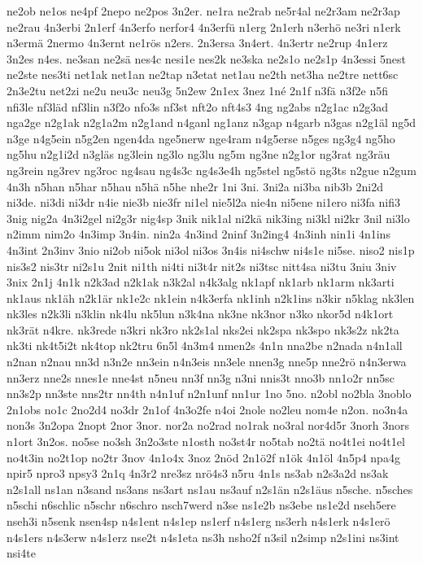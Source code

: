 {ne2ob
ne1os
ne4pf
2nepo
ne2pos
3n2er.
ne1ra
ne2rab
ne5r4al
ne2r3am
ne2r3ap
ne2rau
4n3erbi
2n1erf
4n3erfo
nerfor4
4n3erfü
n1erg
2n1erh
n3erhö
ne3ri
n1erk
n3ermä
2nermo
4n3ernt
ne1rös
n2ers.
2n3ersa
3n4ert.
4n3ertr
ne2rup
4n1erz
3n2es
n4es.
ne3san
ne2sä
nes4c
nesi1e
nes2k
ne3ska
ne2s1o
ne2s1p
4n3essi
5nest
ne2ste
nes3ti
net1ak
net1an
ne2tap
n3etat
net1au
ne2th
net3ha
ne2tre
nett6sc
2n3e2tu
net2zi
ne2u
neu3c
neu3g
5n2ew
2n1ex
3nez
1né
2n1f
n3fä
n3f2e
n5fi
nfi3le
nf3läd
nf3lin
n3f2o
nfo3s
nf3st
nft2o
nft4s3
4ng
ng2abs
n2g1ac
n2g3ad
nga2ge
n2g1ak
n2g1a2m
n2g1and
n4ganl
ng1anz
n3gap
n4garb
n3gas
n2g1äl
ng5d
n3ge
n4g5ein
n5g2en
ngen4da
nge5nerw
nge4ram
n4g5erse
n5ges
ng3g4
ng5ho
ng5hu
n2g1i2d
n3gläs
ng3lein
ng3lo
ng3lu
ng5m
ng3ne
n2g1or
ng3rat
ng3räu
ng3rein
ng3rev
ng3roc
ng4sau
ng4s3c
ng4s3e4h
ng5stel
ng5stö
ng3ts
n2gue
n2gum
4n3h
n5han
n5har
n5hau
n5hä
n5he
nhe2r
1ni
3ni.
3ni2a
ni3ba
nib3b
2ni2d
ni3de.
ni3di
ni3dr
n4ie
nie3b
nie3fr
ni1el
nie5l2a
nie4n
ni5ene
ni1ero
ni3fa
nifi3
3nig
nig2a
4n3i2gel
ni2g3r
nig4sp
3nik
nik1al
ni2kä
nik3ing
ni3kl
ni2kr
3nil
ni3lo
n2imm
nim2o
4n3imp
3n4in.
nin2a
4n3ind
2ninf
3n2ing4
4n3inh
nin1i
4n1ins
4n3int
2n3inv
3nio
ni2ob
ni5ok
ni3ol
ni3os
3n4is
ni4schw
ni4s1e
ni5se.
niso2
nis1p
nis3s2
nis3tr
ni2s1u
2nit
ni1th
ni4ti
ni3t4r
nit2s
ni3tsc
nitt4sa
ni3tu
3niu
3niv
3nix
2n1j
4n1k
n2k3ad
n2k1ak
n3k2al
n4k3alg
nk1apf
nk1arb
nk1arm
nk3arti
nk1aus
nk1äh
n2k1är
nk1e2c
nk1ein
n4k3erfa
nk1inh
n2k1ins
n3kir
n5klag
nk3len
nk3les
n2k3li
n3klin
nk4lu
nk5lun
n3k4na
nk3ne
nk3nor
n3ko
nkor5d
n4k1ort
nk3rät
n4kre.
nk3rede
n3kri
nk3ro
nk2s1al
nks2ei
nk2spa
nk3spo
nk3s2z
nk2ta
nk3ti
nk4t5i2t
nk4top
nk2tru
6n5l
4n3m4
nmen2s
4n1n
nna2be
n2nada
n4n1all
n2nan
n2nau
nn3d
n3n2e
nn3ein
n4n3eis
nn3ele
nnen3g
nne5p
nne2rö
n4n3erwa
nn3erz
nne2s
nnes1e
nne4st
n5neu
nn3f
nn3g
n3ni
nnis3t
nno3b
nn1o2r
nn5sc
nn3s2p
nn3ste
nns2tr
nn4th
n4n1uf
n2n1unf
nn1ur
1no
5no.
n2obl
no2bla
3noblo
2n1obs
no1c
2no2d4
no3dr
2n1of
4n3o2fe
n4oi
2nole
no2leu
nom4e
n2on.
no3n4a
non3s
3n2opa
2nopt
2nor
3nor.
nor2a
no2rad
no1rak
no3ral
nor4d5r
3norh
3nors
n1ort
3n2os.
no5se
no3sh
3n2o3ste
n1osth
no3st4r
no5tab
no2tä
no4t1ei
no4t1el
no4t3in
no2t1op
no2tr
3nov
4n1o4x
3noz
2nöd
2n1ö2f
n1ök
4n1öl
4n5p4
npa4g
npir5
npro3
npsy3
2n1q
4n3r2
nre3sz
nrö4s3
n5ru
4n1s
ns3ab
n2s3a2d
ns3ak
n2s1all
ns1an
n3sand
ns3ans
ns3art
ns1au
ns3auf
n2s1än
n2s1äus
n5sche.
n5sches
n5schi
n6schlic
n5schr
n6schro
nsch7werd
n3se
ns1e2b
ns3ebe
ns1e2d
nseh5ere
nseh3i
n5senk
nsen4sp
n4s1ent
n4s1ep
ns1erf
n4s1erg
ns3erh
n4s1erk
n4s1erö
n4s1ers
n4s3erw
n4s1erz
nse2t
n4s1eta
ns3h
nsho2f
n3sil
n2simp
n2s1ini
ns3int
nsi4te
}
